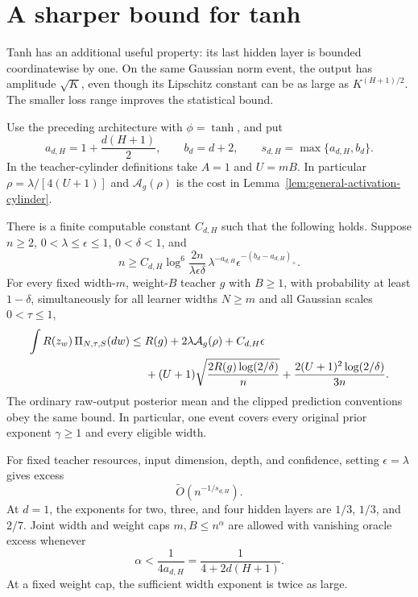 \section{A sharper bound for tanh}
\label{sec:lipschitz-tanh-raw}

Tanh has an additional useful property: its last hidden layer is bounded
coordinatewise by one. On the same Gaussian norm event, the output has
amplitude $\sqrt K$, even though its Lipschitz constant can be as large
as $K^{(H+1)/2}$. The smaller loss range improves the statistical bound.

Use the preceding architecture with $\phi=\tanh$, and put
\[
 a_{d,H}=1+\frac{d(H+1)}2,\qquad b_d=d+2,
 \qquad s_{d,H}=\max\{a_{d,H},b_d\}.
\]
In the teacher-cylinder definitions take $A=1$ and $U=mB$.
In particular $\rho=\lambda/[4(U+1)]$ and
$\mathcal A_g(\rho)$ is the cost in
Lemma~\ref{lem:general-activation-cylinder}.

\begin{theorem}
\label{thm:lipschitz-tanh-raw}
There is a finite computable constant $C_{d,H}$ such that the following
holds. Suppose $n\geq2$, $0<\lambda\leq\epsilon\leq1$,
$0<\delta<1$, and
\begin{equation}
 n\geq C_{d,H}
   \log^6\!\frac{2n}{\lambda\epsilon\delta}\,
   \lambda^{-a_{d,H}}\epsilon^{-(b_d-a_{d,H})_+}.
 \label{eq:lipschitz-tanh-budget}
\end{equation}
For every fixed width-$m$, weight-$B$ teacher $g$ with $B\geq1$,
with probability at least $1-\delta$, simultaneously for all learner
widths $N\geq m$ and all Gaussian scales $0<\tau\leq1$,
\begin{align}
 \int R(z_w)\,\Pi_{N,\tau,S}(dw)
 \leq\;&R(g)+2\lambda\mathcal A_g(\rho)+C_{d,H}\epsilon
 \notag\\
 &+(U+1)\sqrt{\frac{2R(g)\log(2/\delta)}n}
       +\frac{2(U+1)^2\log(2/\delta)}{3n}.
 \label{eq:lipschitz-tanh-oracle}
\end{align}
The ordinary raw-output posterior mean and the clipped prediction
conventions obey the same bound. In particular, one event covers every
original prior exponent $\gamma\geq1$ and every eligible width.

For fixed teacher resources, input dimension, depth, and confidence,
setting $\epsilon=\lambda$ gives excess
\begin{equation}
 \widetilde O\!\left(n^{-1/s_{d,H}}\right).
 \label{eq:lipschitz-tanh-rate}
\end{equation}
At $d=1$, the exponents for two, three, and four hidden layers are
$1/3$, $1/3$, and $2/7$. Joint width and weight caps
$m,B\leq n^\alpha$ are allowed with vanishing oracle excess whenever
\begin{equation}
 \alpha<\frac1{4a_{d,H}}=\frac1{4+2d(H+1)}.
 \label{eq:lipschitz-tanh-growing}
\end{equation}
At a fixed weight cap, the sufficient width exponent is twice as large.
\end{theorem}

